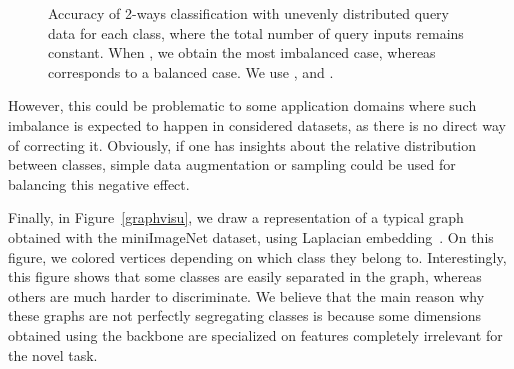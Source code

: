 \documentclass[a4paper,conference]{IEEEtran}
\begin{document}
\begin{figure}[h]
  \begin{center}
  \end{center}
  \vspace{-.5cm}
  \caption{Accuracy of 2-ways classification with unevenly distributed query data for each class, where the total number of query inputs remains constant. When , we obtain the most imbalanced case, whereas  corresponds to a balanced case. We use ,  and .}
  \label{fig:imbalanced}
\end{figure}
However, this could be problematic to some application domains where such imbalance is expected to happen in considered datasets, as there is no direct way of correcting it. Obviously, if one has insights about the relative distribution between classes, simple data augmentation or sampling could be used for balancing this negative effect.

Finally, in Figure~\ref{graphvisu}, we draw a representation of a typical graph obtained with the miniImageNet dataset, using Laplacian embedding~\cite{horaud2009short,shuman2013emerging}. On this figure, we colored vertices depending on which class they belong to. Interestingly, this figure shows that some classes are easily separated in the graph, whereas others are much harder to discriminate. We believe that the main reason why these graphs are not perfectly segregating classes is because some dimensions obtained using the backbone are specialized on features completely irrelevant for the novel task.
\end{document}
